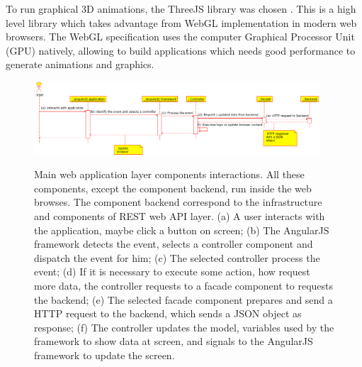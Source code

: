 \documentclass[journal]{IEEEtran}
\begin{document}
To run graphical 3D animations, the ThreeJS library was chosen \cite{Dirksen2015}.
This is a high level library  which takes advantage from WebGL implementation in modern web browsers.
The WebGL specification \cite{Matsuda2013} uses the computer Graphical Processor Unit (GPU) natively, 
allowing to build applications which needs good performance to generate animations and graphics.

\begin{figure}[tb]
	\centering
	{\includegraphics[width=0.95\textwidth]{./web_components.eps}}
	\caption{Main web application layer components interactions.
		All these components, except the component backend, run inside the web browses.
		The component backend correspond to the infrastructure and components of REST web API layer.
		(a) A user interacts with the application, maybe click a button on screen;
		(b) The AngularJS framework detects the event, selects a controller component and
		dispatch the event for him;
		(c) The selected controller process the event;
		(d) If it is necessary to execute some action, how request more data, the controller 
		requests to a facade component to requests the backend;
		(e) The selected facade component prepares and send a HTTP request to the backend,
		which sends a JSON object as response;
		(f) The controller updates the model, variables used by the framework to show data at screen,
		and signals to the AngularJS framework to update the screen.
	}
	\label{web_components}
\end{figure}
\end{document}
